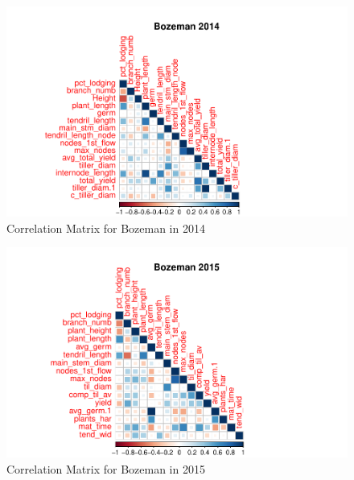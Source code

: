 \documentclass[11pt]{article}\usepackage[]{graphicx}\usepackage[]{color}
\makeatletter
\def\maxwidth{ %
  \ifdim\Gin@nat@width>\linewidth
    \linewidth
  \else
    \Gin@nat@width
  \fi
}
\newenvironment{knitrout}{}{} %
\makeatother
\begin{document}
\begin{knitrout}\footnotesize
{}\color{fgcolor}\begin{figure}[H]

{\centering \includegraphics[width=\maxwidth]{figure/nextchunk1-1} 

}

\caption[Correlation Matrix for Bozeman in 2014]{Correlation Matrix for Bozeman in 2014}\label{fig:nextchunk1}
\end{figure}


\end{knitrout}

\begin{knitrout}\footnotesize
{}\color{fgcolor}\begin{figure}[H]

{\centering \includegraphics[width=\maxwidth]{figure/nextchunk-1} 

}

\caption[Correlation Matrix for Bozeman in 2015]{Correlation Matrix for Bozeman in 2015}\label{fig:nextchunk}
\end{figure}


\end{knitrout}
\end{document}
